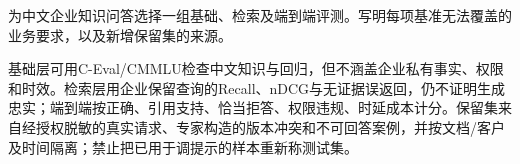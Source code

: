 \begin{exercises}
\begin{exercise} 为中文企业知识问答选择一组基础、检索及端到端评测。写明每项基准无法覆盖的业务要求，以及新增保留集的来源。

\begin{solution}
基础层可用C-Eval/CMMLU检查中文知识与回归，但不涵盖企业私有事实、权限和时效。检索层用企业保留查询的Recall、nDCG与无证据误返回，仍不证明生成忠实；端到端按正确、引用支持、恰当拒答、权限违规、时延成本计分。保留集来自经授权脱敏的真实请求、专家构造的版本冲突和不可回答案例，并按文档/客户及时间隔离；禁止把已用于调提示的样本重新称测试集。
\end{solution}
\end{exercise}

\end{exercises}
